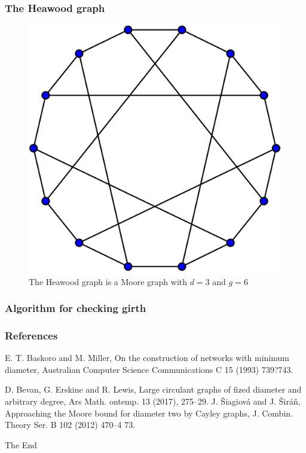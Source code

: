 \documentclass{beamer}
\begin{document}
\begin{frame}
    \frametitle{The Heawood graph}
    \begin{figure}[!ht]
        \centering
        \includegraphics[scale=0.15]{Heawood_graph.png}
        \caption{The Heawood graph is a Moore graph with $d=3$ and $g=6$ }
    \end{figure}
\end{frame}
\begin{frame}
    \frametitle{Algorithm for checking girth}
	
\end{frame}
\begin{frame}
	\frametitle{References}
    \footnotesize{
    	\begin{thebibliography}{99} %
			 E. T. Baskoro and M. Miller, On the construction of networks with minimum diameter,
				Australian Computer Science Communications C 15 (1993) 739?743.

			 D. Bevan, G. Erskine and R. Lewis, Large circulant graphs of fized diameter and arbitrary degree, Ars Math. ontemp. 13 (2017), 275--29.
			 J. \v{S}iagiov\'a and J. \v{S}ir\'a\v{n}, Approaching the Moore bound for diameter two by Cayley graphs, J. Combin. Theory Ser. B 102 (2012) 470--4    73.
        \end{thebibliography}
    }
\end{frame}
\begin{frame}
\Huge{\centerline{The End}}
\end{frame}
\end{document}
